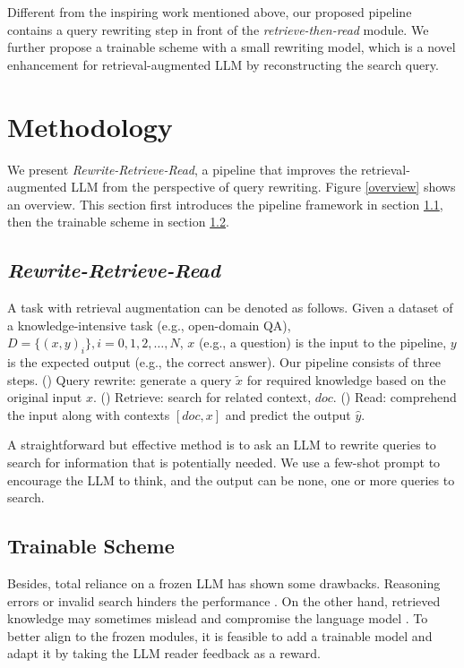Different from the inspiring work mentioned above, our proposed pipeline contains a query rewriting step in front of the \textit{retrieve-then-read} module. We further propose a trainable scheme with a small rewriting model, which is a novel enhancement for retrieval-augmented LLM by reconstructing the search query.

\section{Methodology}
We present \textit{Rewrite-Retrieve-Read}, a pipeline that improves the retrieval-augmented LLM from the perspective of query rewriting. Figure \ref{overview} shows an overview.
This section first introduces the pipeline framework in section \ref{fw}, then the trainable scheme in section \ref{ts}.

\subsection{\textit{Rewrite-Retrieve-Read}} \label{fw}
A task with retrieval augmentation can be denoted as follows. 
Given a dataset of a knowledge-intensive task (e.g., open-domain QA), $D = \{(x, y)_i\}, i = 0,1,2, \dots, N$, $x$ (e.g., a question) is the input to the pipeline, $y$ is the expected output (e.g., the correct answer). 
Our pipeline consists of three steps. 
() Query rewrite: generate a query $\tilde{x}$ for required knowledge based on the original input $x$. 
() Retrieve: search for related context, $doc$.
() Read: comprehend the input along with contexts $[doc, x]$ and predict the output $\hat{y}$.

A straightforward but effective method is to ask an LLM to rewrite queries to search for information that is potentially needed.
We use a few-shot prompt to encourage the LLM to think, and the output can be none, one or more queries to search.

\subsection{Trainable Scheme} \label{ts}
Besides, total reliance on a frozen LLM has shown some drawbacks. 
Reasoning errors or invalid search hinders the performance \cite{yao2023react, behnamghader2022can}.
On the other hand, retrieved knowledge may sometimes mislead and compromise the language model \cite{mallen2023llm_memorization}.
To better align to the frozen modules, it is feasible to add a trainable model and adapt it by taking the LLM reader feedback as a reward.

